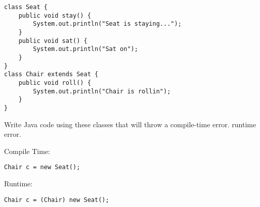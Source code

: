 \begin{blocksection}
\question
\begin{lstlisting}
class Seat {
    public void stay() {
        System.out.println("Seat is staying...");
    }
    public void sat() {
        System.out.println("Sat on");
    }
}
class Chair extends Seat {
    public void roll() {
        System.out.println("Chair is rollin");
    }
}
\end{lstlisting}

Write Java code using these classes that will throw a compile-time error. runtime error.

\begin{Solution}
Compile Time:
\begin{verbatim}
Chair c = new Seat();
\end{verbatim}

Runtime:
\begin{verbatim}
Chair c = (Chair) new Seat();
\end{verbatim}

\end{Solution}

\end{blocksection}
